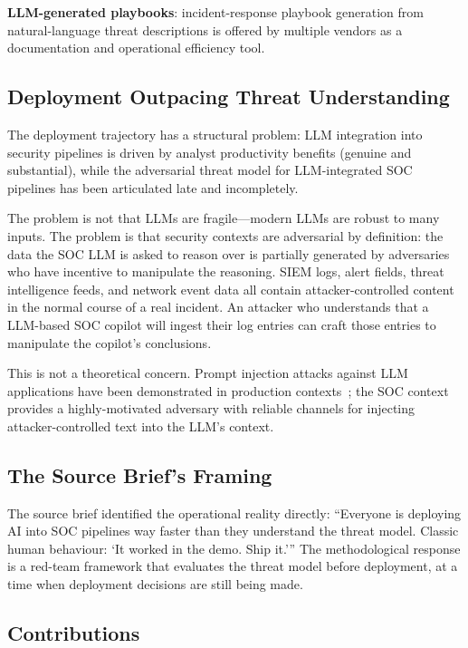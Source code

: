 \documentclass[sigconf,nonacm]{acmart}
\begin{document}
\textbf{LLM-generated playbooks}: incident-response playbook
generation from natural-language threat descriptions is offered
by multiple vendors as a documentation and operational efficiency
tool.

\subsection{Deployment Outpacing Threat Understanding}

The deployment trajectory has a structural problem: LLM
integration into security pipelines is driven by analyst
productivity benefits (genuine and substantial), while the
adversarial threat model for LLM-integrated SOC pipelines has
been articulated late and incompletely.

The problem is not that LLMs are fragile---modern LLMs are
robust to many inputs. The problem is that security contexts
are adversarial by definition: the data the SOC LLM is asked
to reason over is partially generated by adversaries who have
incentive to manipulate the reasoning. SIEM logs, alert fields,
threat intelligence feeds, and network event data all contain
attacker-controlled content in the normal course of a real
incident. An attacker who understands that a LLM-based SOC
copilot will ingest their log entries can craft those entries
to manipulate the copilot's conclusions.

This is not a theoretical concern. Prompt injection attacks
against LLM applications have been demonstrated in production
contexts~\cite{perez2022promptinjection,greshake2023indirect};
the SOC context provides a highly-motivated adversary with
reliable channels for injecting attacker-controlled text into
the LLM's context.

\subsection{The Source Brief's Framing}

The source brief identified the operational reality directly:
``Everyone is deploying AI into SOC pipelines way faster than
they understand the threat model. Classic human behaviour: `It
worked in the demo. Ship it.''' The methodological response is
a red-team framework that evaluates the threat model before
deployment, at a time when deployment decisions are still
being made.

\subsection{Contributions}
\end{document}
